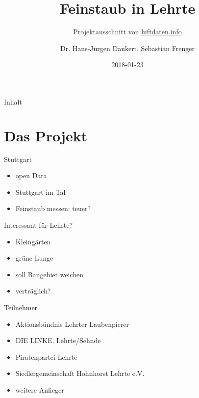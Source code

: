 \documentclass[aspectratio=169]{beamer} %
\begin{document}
\title{Feinstaub in Lehrte}
\subtitle{Projektausschnitt von \href{http://www.luftdaten.info}{luftdaten.info}}
\author{Dr. Hans-Jürgen Dankert, Sebastian Frenger}
\date{2018-01-23} 

\frame{\titlepage} 

\begin{frame}{Inhalt}
\tableofcontents
\end{frame}

\section{Das Projekt}  
\begin{frame}{Stuttgart}
  \begin{itemize}
  \item open Data
  \item Stuttgart im Tal
  \item Feinstaub messen: teuer?
  \end{itemize}
\end{frame}

\begin{frame}{Interessant für Lehrte?}
  \begin{itemize}
  \item Kleingärten
  \item grüne Lunge
  \item soll Baugebiet weichen
  \item verträglich?
  \end{itemize}
\end{frame}

\begin{frame}{Teilnehmer}
  \begin{itemize}
  \item Aktionsbündnis Lehrter Laubenpierer
  \item DIE LINKE. Lehrte/Sehnde
  \item Piratenpartei Lehrte
  \item Siedlergemeinschaft Hohnhorst Lehrte e.V.
  \item weitere Anlieger
  \end{itemize}
\end{frame}
\end{document}
